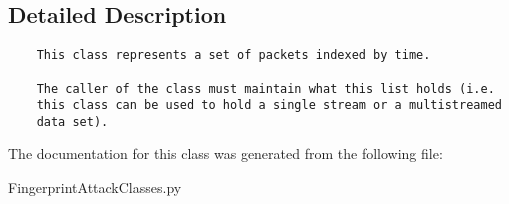 \subsection{Detailed Description}


\footnotesize\begin{verbatim}
    This class represents a set of packets indexed by time.

    The caller of the class must maintain what this list holds (i.e.
    this class can be used to hold a single stream or a multistreamed
    data set). 
\end{verbatim}
\normalsize
 

The documentation for this class was generated from the following file:\begin{CompactItemize}
\item 
FingerprintAttackClasses.py\end{CompactItemize}
